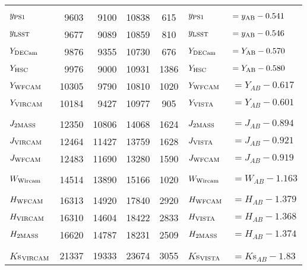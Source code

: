 \documentclass[usenatbib]{mnras}
\begin{document}
\begin{table*}
\begin{center}
\begin{tabular}{l r r r  c l l}
      &&&&&&\\
      $y_{\rm PS1}$       &       9603    &  9100    &    10838  &     615       &  $y_{\rm PS1}    $       &$   = y_{\rm AB} -  0.541 $ \\
      $y_{\rm LSST}$      &       9677   &	 9089    &    10859  &     810         &  $y_{\rm LSST}  $      &$    = y_{\rm AB} - 0.546 $ \\
      $Y_{\rm DECam}$   &      9876   &	  9355    &      10730   &    676      &  $Y_{\rm DECam}  $   &$  =Y_{\rm AB} - 0.570 $ \\
      $Y_{\rm HSC}$       &      9976   &    9000    & 	10931  &   1386    &  $Y_{\rm HSC}  $   &$  =Y_{\rm AB} - 0.580 $ \\
      $Y_{\rm WFCAM}$    &   10305    &   9790      &   10810   &   1020     & $Y_{\rm WFCAM}$     &$ =  Y_{AB}  - 0.617$           \\
      $Y_{\rm VIRCAM}$     &    10184    &   9427      &   10977   &    905        & $Y_{\rm VISTA} $     &$ = Y_{AB}  - 0.601 $          \\
      &&&&&&\\
      $J_{\rm 2MASS}$       &   12350   &       10806  & 	14068  &  1624       &  $J_{\rm 2MASS}  $     & $= J_{AB}    - 0.894  $         \\
      $J_{\rm VIRCAM} $     &   12464   &      11427   &    13759   &  1628     &  $J_{\rm VISTA}  $     & $= J_{AB}    - 0.921  $         \\
      $J_{\rm WFCAM} $    &    12483   &     11690  &    13280   &   1590      & $J_{\rm WFCAM}$     & $= J_{AB}    - 0.919 $          \\
      &&&&&&\\
      $W_{\rm Wircam}$   &    14514    &    13890   &    15166   &   1020    & $W_{\rm Wircam} $    & $= W_{AB}  -  1.163$           \\
      &&&&&&\\
      $H_{\rm WFCAM}$    &    16313     &    14920  &    17840   &   2920    & $H_{\rm WFCAM} $   & $= H_{AB}  - 1.379$          \\
      $H_{\rm VIRCAM}$      &    16310    &    14604   &    18422   &   2833     & $H_{\rm VISTA}$      & $= H_{AB}  - 1.368 $        \\
      $H_{\rm 2MASS}$      & 16620        & 	14787  &   18231   & 2509      & $H_{\rm 2MASS}$      & $= H_{AB}  - 1.374 $        \\
      &&&&&&\\
      $K$s$_{\rm VIRCAM}$     &    21337    &    19333  &    23674   &   3055     & $K$s$_{\rm VISTA}$      & $ = K$s$_{AB} - 1.83  $          \\ 

\end{tabular}
\end{center}
\end{table*}
\end{document}
